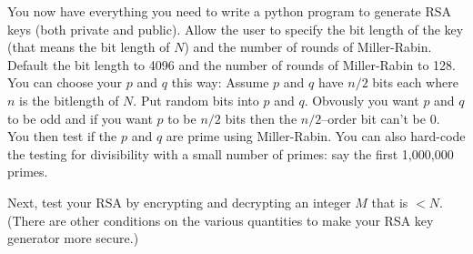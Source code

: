   You now have everything you need to write a python program to
  generate RSA keys (both private and public).
  Allow the user to specify the bit length of the key (that means 
  the bit length of $N$) and the number of rounds of Miller-Rabin.
  Default the bit length to 4096 and the number of rounds of Miller-Rabin to 128.
  You can choose your $p$ and $q$ this way:
  Assume $p$ and $q$ have $n/2$ bits each where $n$ is the bitlength of $N$.
  Put random bits into $p$ and $q$.
  Obvously you want $p$ and $q$ to be odd and if you want $p$ to be $n/2$ bits
  then the $n/2$--order bit can't be 0.
  You then test if the $p$ and $q$ are prime using Miller-Rabin.
  You can also hard-code the testing for divisibility with a small number of primes:
  say the first 1,000,000 primes.
  
  Next, test your RSA by encrypting and decrypting an integer $M$ that is $< N$.
  (There are other conditions on the various quantities to make your RSA key generator more secure.)
